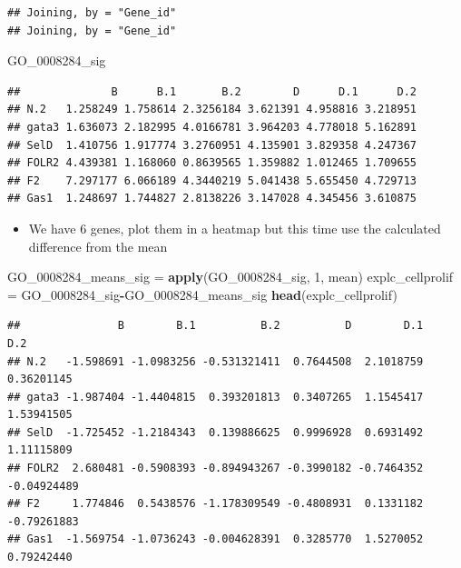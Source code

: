 \documentclass[
]{article}
\newenvironment{Shaded}{\begin{snugshade}}{\end{snugshade}}
\newcommand{\DecValTok}[1]{\textcolor[rgb]{0.00,0.00,0.81}{#1}}
\newcommand{\KeywordTok}[1]{\textcolor[rgb]{0.13,0.29,0.53}{\textbf{#1}}}
\newcommand{\NormalTok}[1]{#1}
\newcommand{\OperatorTok}[1]{\textcolor[rgb]{0.81,0.36,0.00}{\textbf{#1}}}
\newcommand{\StringTok}[1]{\textcolor[rgb]{0.31,0.60,0.02}{#1}}
\providecommand{\tightlist}{%
  \setlength{\itemsep}{0pt}\setlength{\parskip}{0pt}}
\begin{document}
\begin{verbatim}
## Joining, by = "Gene_id"
## Joining, by = "Gene_id"
\end{verbatim}

\begin{Shaded}
\begin{Highlighting}[]
\NormalTok{GO_}\DecValTok{0008284}\NormalTok{_sig}
\end{Highlighting}
\end{Shaded}

\begin{verbatim}
##              B      B.1       B.2        D      D.1      D.2
## N.2   1.258249 1.758614 2.3256184 3.621391 4.958816 3.218951
## gata3 1.636073 2.182995 4.0166781 3.964203 4.778018 5.162891
## SelD  1.410756 1.917774 3.2760951 4.135901 3.829358 4.247367
## FOLR2 4.439381 1.168060 0.8639565 1.359882 1.012465 1.709655
## F2    7.297177 6.066189 4.3440219 5.041438 5.655450 4.729713
## Gas1  1.248697 1.744827 2.8138226 3.147028 4.345456 3.610875
\end{verbatim}

\begin{itemize}
\tightlist
\item
  We have 6 genes, plot them in a heatmap but this time use the
  calculated difference from the mean
\end{itemize}

\begin{Shaded}
\begin{Highlighting}[]
\NormalTok{GO_}\DecValTok{0008284}\NormalTok{_means_sig =}\StringTok{ }\KeywordTok{apply}\NormalTok{(GO_}\DecValTok{0008284}\NormalTok{_sig, }\DecValTok{1}\NormalTok{, mean)}
\NormalTok{explc_cellprolif =}\StringTok{ }\NormalTok{GO_}\DecValTok{0008284}\NormalTok{_sig}\OperatorTok{-}\NormalTok{GO_}\DecValTok{0008284}\NormalTok{_means_sig}
\KeywordTok{head}\NormalTok{(explc_cellprolif)}
\end{Highlighting}
\end{Shaded}

\begin{verbatim}
##               B        B.1          B.2          D        D.1         D.2
## N.2   -1.598691 -1.0983256 -0.531321411  0.7644508  2.1018759  0.36201145
## gata3 -1.987404 -1.4404815  0.393201813  0.3407265  1.1545417  1.53941505
## SelD  -1.725452 -1.2184343  0.139886625  0.9996928  0.6931492  1.11115809
## FOLR2  2.680481 -0.5908393 -0.894943267 -0.3990182 -0.7464352 -0.04924489
## F2     1.774846  0.5438576 -1.178309549 -0.4808931  0.1331182 -0.79261883
## Gas1  -1.569754 -1.0736243 -0.004628391  0.3285770  1.5270052  0.79242440
\end{verbatim}
\end{document}
